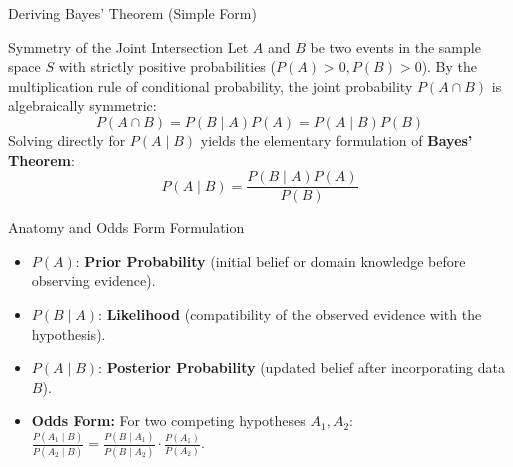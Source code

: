 \documentclass[10pt, aspectratio=169]{beamer}
\begin{document}
\begin{frame}{Deriving Bayes' Theorem (Simple Form)}
  \fontsize{7.5pt}{9pt}\selectfont
  \begin{block}{Symmetry of the Joint Intersection}
    \fontsize{7.5pt}{9pt}\selectfont
    Let $A$ and $B$ be two events in the sample space $S$ with strictly positive probabilities ($P(A)>0, P(B)>0$). By the multiplication rule of conditional probability, the joint probability $P(A \cap B)$ is algebraically symmetric:
    $$P(A \cap B) = P(B \mid A)P(A) = P(A \mid B)P(B)$$
    Solving directly for $P(A \mid B)$ yields the elementary formulation of \textbf{Bayes' Theorem}:
    $$P(A \mid B) = \frac{P(B \mid A)P(A)}{P(B)}$$
  \end{block}
  \vspace{-0.15cm}
  \pause
  \begin{alertblock}{Anatomy and Odds Form Formulation}
    \fontsize{7.5pt}{9pt}\selectfont
    \begin{itemize}\itemsep=0.08cm
      \item $P(A)$: \textbf{Prior Probability} (initial belief or domain knowledge before observing evidence).
      \item $P(B \mid A)$: \textbf{Likelihood} (compatibility of the observed evidence with the hypothesis).
      \item $P(A \mid B)$: \textbf{Posterior Probability} (updated belief after incorporating data $B$).
      \item \textbf{Odds Form:} For two competing hypotheses $A_1, A_2$: $\displaystyle \frac{P(A_1 \mid B)}{P(A_2 \mid B)} = \frac{P(B \mid A_1)}{P(B \mid A_2)} \cdot \frac{P(A_1)}{P(A_2)}$.
    \end{itemize}
  \end{alertblock}
\end{frame}
\end{document}
